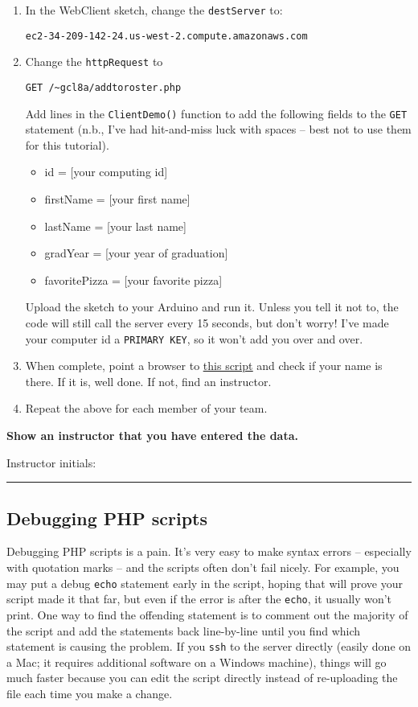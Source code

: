 \documentclass[11pt]{article} %
\begin{document}
\begin{enumerate}
\item In the WebClient sketch, change the \verb|destServer| to:

\verb|ec2-34-209-142-24.us-west-2.compute.amazonaws.com|
\item Change the \verb|httpRequest| to 

\verb|GET /~gcl8a/addtoroster.php| 

Add lines in the \verb|ClientDemo()| function to add the following fields to the \verb|GET| statement (n.b., I’ve had hit-and-miss luck with spaces -- best not to use them for this tutorial).
\begin{itemize}
\item id = [your computing id]
\item firstName = [your first name]
\item lastName = [your last name]
\item gradYear = [your year of graduation]
\item favoritePizza = [your favorite pizza]
\end{itemize}
Upload the sketch to your Arduino and run it. Unless you tell it not to, the code will still call the server every 15 seconds, but don’t worry! I’ve made your computer id a \verb|PRIMARY KEY|, so it won’t add you over and over.
\item When complete, point a browser to \href{http://ec2-34-209-142-24.us-west-2.compute.amazonaws.com/~gcl8a/getroster.php}{\underline{this script}} and check if your name is there. If it is, well done. If not, find an instructor.
\item Repeat the above for each member of your team.
\end{enumerate}

{\bf Show an instructor that you have entered the data.}

\vspace{0.25in}
Instructor initials: \rule{2in}{0.4pt}
\vspace{0.25in}

\subsection*{Debugging PHP scripts}

Debugging PHP scripts is a pain. It’s very easy to make syntax errors -- especially with quotation marks -- and the scripts often don’t fail nicely. For example, you may put a debug \verb|echo| statement early in the script, hoping that will prove your script made it that far, but even if the error is after the \verb|echo|, it usually won’t print. One way to find the offending statement is to comment out the majority of the script and add the statements back line-by-line until you find which statement is causing the problem. If you \verb|ssh| to the server directly (easily done on a Mac; it requires additional software on a Windows machine), things will go much faster because you can edit the script directly instead of re-uploading the file each time you make a change.
\end{document}
